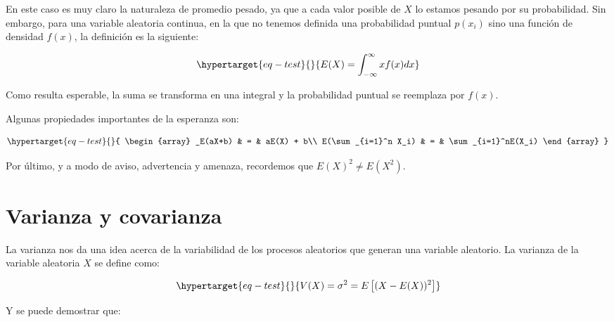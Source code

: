 \documentclass[
  letterpaper,
  DIV=11,
  numbers=noendperiod,
  oneside]{scrreprt}
\begin{document}
En este caso es muy claro la naturaleza de promedio pesado, ya que a
cada valor posible de \(X\) lo estamos pesando por su probabilidad. Sin
embargo, para una variable aleatoria continua, en la que no tenemos
definida una probabilidad puntual \(p(x_i)\) sino una función de
densidad \(f(x)\), la definición es la siguiente:

\begin{equation}\protect\hypertarget{eq-test}{}{
E(X) = \int_{-\infty}^\infty x f(x) dx
}\label{eq-test}\end{equation}

Como resulta esperable, la suma se transforma en una integral y la
probabilidad puntual se reemplaza por \(f(x)\).

Algunas propiedades importantes de la esperanza son:

\begin{equation}\protect\hypertarget{eq-test}{}{
\begin{array}
_E(aX+b) & = & aE(X) + b\\
E(\sum_{i=1}^n X_i) & = & \sum_{i=1}^nE(X_i)
\end{array}
}\label{eq-test}\end{equation}

Por último, y a modo de aviso, advertencia y amenaza, recordemos que
\(E(X)^2 \neq E(X^2)\).

\hypertarget{varianza-y-covarianza}{%
\section{Varianza y covarianza}\label{varianza-y-covarianza}}

La varianza nos da una idea acerca de la variabilidad de los procesos
aleatorios que generan una variable aleatorio.
La varianza de la variable aleatoria \(X\) se define como:

\begin{equation}\protect\hypertarget{eq-test}{}{
V(X) = \sigma^2 = E \left[ (X - E(X))^2 \right]
}\label{eq-test}\end{equation}

Y se puede demostrar que:
\end{document}
